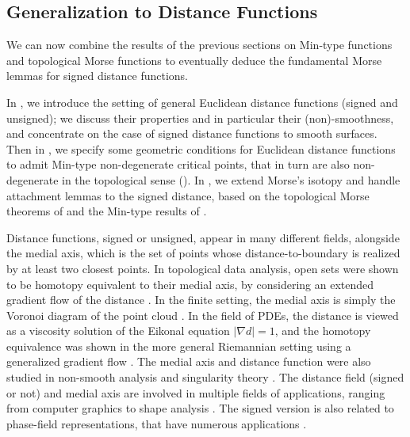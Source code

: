 \documentclass[11pt]{article}
\newcommand{\grad}{\nabla}
\theoremstyle{plain}
\theoremstyle{definition}
\theoremstyle{remark}
\begin{document}
	
	\subsection{Generalization to Distance Functions}
	\label{sec:generalization_dist_functions}
	
	We can now combine the results of the previous sections on Min-type functions and topological Morse functions to eventually deduce the fundamental Morse lemmas for signed distance functions.
	
	In , we introduce the setting of general Euclidean distance functions (signed and unsigned); we discuss their properties and in particular their (non)-smoothness, and concentrate on the case of signed distance functions to smooth surfaces.
	Then in , we specify some geometric conditions for Euclidean distance functions to admit Min-type non-degenerate critical points, that in turn are also non-degenerate in the topological sense ().
	In , we extend Morse's isotopy and handle attachment lemmas to the signed distance, based on the topological Morse theorems of  and the Min-type results of .
	
	Distance functions, signed or unsigned, appear in many different fields, alongside the medial axis, which is the set of points whose distance-to-boundary is realized by at least two closest points. In topological data analysis, open sets were shown to be homotopy equivalent to their medial axis, by considering an extended gradient flow of the distance \citep{lieutier_any_2003, chazal_stability_2004}. In the finite setting, the medial axis is simply the Voronoi diagram of the point cloud \citep{lieutier_any_2003,attali_stability_2009}.
	In the field of PDEs, the distance is viewed as a viscosity solution of the Eikonal equation $\vert \grad d \vert = 1$, and the homotopy equivalence was shown in the more general Riemannian setting using a generalized gradient flow \citep{albano_singular_2013}. The medial axis and distance function were also studied in non-smooth analysis and singularity theory \citep{cheeger_critical_1991,birbrair_medial_2017}.
	The distance field (signed or not) and medial axis are involved in multiple fields of applications, ranging from computer graphics to shape analysis \citep{lee_medial_1982, lindquist_medial_1996, sigg_signed_2003, park_deepsdf_2019}. The signed version is also related to phase-field representations, that have numerous applications \citep{song_generation_2022}.
	
\end{document}
